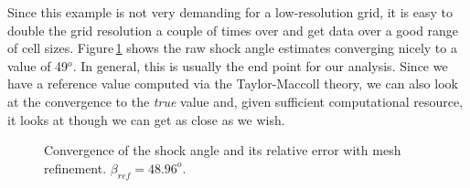 \medskip
Since this example is not very demanding for a low-resolution grid, 
it is easy to double the grid resolution a couple of times over and get
data over a good range of cell sizes.
Figure\,\ref{cone20-grid-convergence-fig} shows the raw shock angle estimates
converging nicely to a value of 49$^o$.
In general, this is usually the end point for our analysis.
Since we have a reference value computed via the Taylor-Maccoll theory,
we can also look at the convergence to the \textit{true} value and,
given sufficient computational resource, 
it looks at though we can get as close as we wish.

\begin{figure}
 \centering
 \parbox{0.45\textwidth}{
 }
 \parbox{0.45\textwidth}{
 }
 \caption{Convergence of the shock angle and its relative error with mesh refinement.
          $\beta_{ref} = 48.96^o$.}
 \label{cone20-grid-convergence-fig}
\end{figure}

